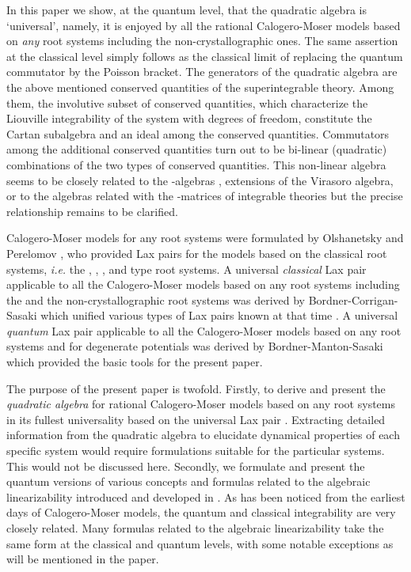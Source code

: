 \documentclass[a4paper,12pt]{article}
\begin{document}
In this paper we show, at the quantum level,
that the quadratic algebra is `universal', namely,  it is
enjoyed by all the  rational Calogero-Moser models based on {\em any}
root systems including the non-crystallographic ones.
The same assertion at the classical level simply follows as the
classical limit of replacing the quantum commutator by the Poisson
bracket.
The generators of the quadratic algebra are
 the  above mentioned conserved quantities of the
superintegrable theory. Among them, the involutive subset of \coordHE{}
conserved quantities, which characterize the Liouville integrability
of the system with \coordHE{} degrees of freedom, constitute the Cartan
subalgebra and an ideal among the conserved quantities.
Commutators among the additional conserved quantities turn out to be
bi-linear
(quadratic)
 combinations of the two types of conserved quantities.
 This non-linear algebra seems to be closely related
to
the \coordHE{}-algebras \cite{Zam}, extensions of the Virasoro algebra,
or to the algebras related with  the \coordHE{}-matrices of integrable theories
\cite{Freidel-Maill} but
the precise relationship remains to be clarified.

Calogero-Moser models for any root systems were formulated by
Olshanetsky and Perelomov \cite{OP1}, who  provided Lax pairs
for the models based on the classical root systems, {\em i.e.\/}
the \coordHE{}, \coordHE{}, \coordHE{}, \coordHE{} and \coordHE{} type root systems.
A universal {\em classical\/} Lax pair applicable to all
the Calogero-Moser models
based on any root systems including the \coordHE{} and the
non-crystallographic root systems was derived by Bordner-Corrigan-Sasaki
\cite{bcs2}
which unified various types of Lax pairs known at
that time
\cite{DHoker_Phong, bcs1}.
A universal {\em quantum\/} Lax pair applicable to all the Calogero-Moser
models
based on any root systems and for degenerate potentials
 was derived by Bordner-Manton-Sasaki \cite{bms}
 which provided the basic tools
for the present paper.

The purpose of the present paper is twofold.
Firstly, to derive and present the
{\em quadratic algebra\/} for rational  Calogero-Moser models based on
any root systems in its fullest universality based on the universal
Lax pair \cite{bms}. Extracting detailed information from the
quadratic algebra to elucidate dynamical properties of each specific
system would require  formulations suitable for the
particular systems. This would not be discussed here. Secondly, we
formulate and present the quantum versions of
 various concepts and formulas
related to the algebraic linearizability introduced and
developed in
\cite{cfs}. As has been noticed from the earliest days of
Calogero-Moser models, the quantum and classical integrability
are very closely related. Many formulas related to  the
algebraic linearizability take the same form at the classical
and quantum levels, with some notable exceptions as will be
mentioned in the paper.
\end{document}
